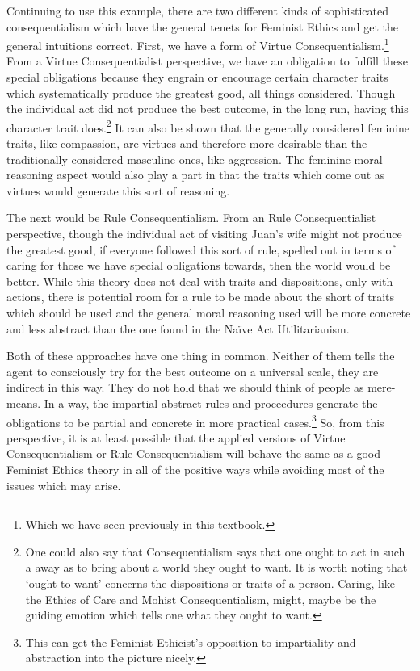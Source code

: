Continuing to use this example, there are two different kinds of sophisticated consequentialism which have the general tenets for Feminist Ethics and get the general intuitions correct. First, we have a form of Virtue Consequentialism.\footnote{Which we have seen previously in this textbook.} From a Virtue Consequentialist perspective, we have an obligation to fulfill these special obligations because they engrain or encourage certain character traits which systematically produce the greatest good, all things considered. Though the individual act did not produce the best outcome, in the long run, having this character trait does.\footnote{One could also say that Consequentialism says that one ought to act in such a away as to bring about a world they ought to want. It is worth noting that `ought to want' concerns the dispositions or traits of a person. Caring, like the Ethics of Care and Mohist Consequentialism, might, maybe be the guiding emotion which tells one what they ought to want.} It can also be shown that the generally considered feminine traits, like compassion, are virtues and therefore more desirable than the traditionally considered masculine ones, like aggression. The feminine moral reasoning aspect would also play a part in that the traits which come out as virtues would generate this sort of reasoning. 

The next would be Rule Consequentialism. From an Rule Consequentialist perspective, though the individual act of visiting Juan’s wife might not produce the greatest good, if everyone followed this sort of rule, spelled out in terms of caring for those we have special obligations towards, then the world would be better. While this theory does not deal with traits and dispositions, only with actions, there is potential room for a rule to be made about the short of traits which should be used and the general moral reasoning used will be more concrete and less abstract than the one found in the Na\"ive Act Utilitarianism. 

Both of these approaches have one thing in common. Neither of them tells the agent to consciously try for the best outcome on a universal scale, they are indirect in this way. They do not hold that we should think of people as mere-means. In a way, the impartial abstract rules and proceedures generate the obligations to be partial and concrete in more practical cases.\footnote{This can get the Feminist Ethicist's opposition to impartiality and abstraction into the picture nicely.} So, from this perspective, it is at least possible that the applied versions of Virtue Consequentialism or Rule Consequentialism will behave the same as a good Feminist Ethics theory in all of the positive ways while avoiding most of the issues which may arise. 

